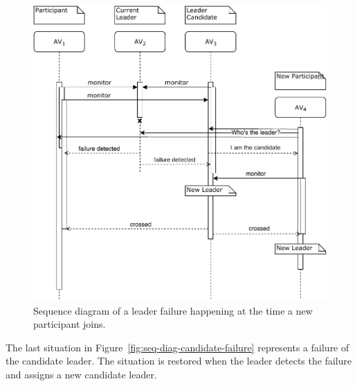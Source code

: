 \documentclass{memoir}
\begin{document}
\begin{figure}
	\centering
	\includegraphics[width=\linewidth]{sequence_diagrams/new_participant.pdf}
	\caption{Sequence diagram of a leader failure happening at the time a new participant joins.}
	\label{fig:seq-diag-new-participant}
\end{figure}

The last situation in Figure~\ref{fig:seq-diag-candidate-failure} represents a failure of the candidate leader. The situation is restored when the leader detects the failure and assigns a new candidate leader.
\end{document}
